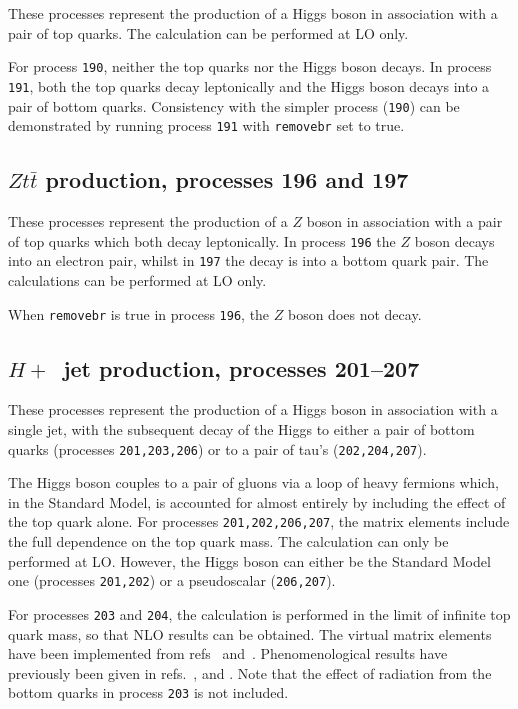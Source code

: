 \documentclass[12pt]{article}
\begin{document}
These processes represent the production of a Higgs boson in association
with a pair of top quarks. The calculation can be performed at LO only.

For process {\tt 190}, neither the top quarks nor the Higgs boson
decays. In process {\tt 191}, both the top quarks decay leptonically
and the Higgs boson decays into a pair of bottom quarks. 
Consistency with
the simpler process ({\tt 190}) can be demonstrated by running process
{\tt 191} with {\tt removebr} set to true.

\subsection{$Zt{\bar t}$ production, processes 196 and 197}
\label{subsec:ztt}

These processes represent the production of a $Z$ boson in association
with a pair of top quarks which both decay leptonically.
In process {\tt 196} the $Z$ boson decays into an electron pair, whilst
in {\tt 197} the decay is into a bottom quark pair.
The calculations can be performed at LO only.

When {\tt removebr} is true in process {\tt 196}, the $Z$ boson does not decay.

\subsection{$H+$~jet production, processes 201--207}
\label{subsec:hjet}

These processes represent the production of a Higgs boson in association
with a single jet, with the subsequent decay of the Higgs to either
a pair of bottom quarks (processes {\tt 201,203,206}) or to a pair of
tau's ({\tt 202,204,207}).

The Higgs boson couples to a pair of gluons via a loop of heavy fermions
which, in the Standard Model, is accounted for almost entirely by including
the effect of the top quark alone. For processes {\tt 201,202,206,207}, the
matrix elements include the full dependence on the top quark mass.
The calculation can only be performed at LO. 
However, the Higgs boson can either be the Standard Model one
(processes {\tt 201,202}) or a pseudoscalar ({\tt 206,207}).

For processes {\tt 203} and {\tt 204}, the calculation is performed in the
limit of infinite top quark mass, so that NLO results can be obtained.
The virtual matrix elements have been implemented from
refs~\cite{Ravindran:2002dc} and~\cite{Schmidt:1997wr}.
Phenomenological results have previously been 
given in refs.~\cite{deFlorian:1999zd},\cite{Ravindran:2002dc} 
and \cite{Glosser:2002gm}.
Note that the effect of radiation from the bottom quarks in process {\tt 203}
is not included.
\end{document}
